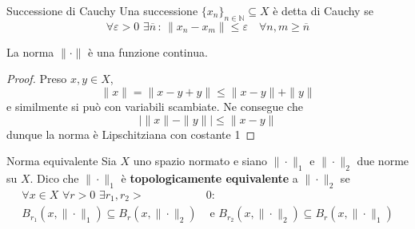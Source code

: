 \begin{definition}{Successione di Cauchy}
    Una successione \(\{x_{n}\}_{n \in \mathbb{N}} \subseteq X \) è detta di
    Cauchy se
    \[
      \forall \varepsilon >0 \,\, \exists \overline{n} \,:\, \|x_{n} - x_{m}\| \le \varepsilon \quad \forall n,m \ge \overline{n}
    \]
\end{definition}

\begin{remark}{}
    La norma \(\|\cdot \|\) è una funzione continua.
\end{remark}
\begin{proof}{}
    Preso \(x,y \in X\),
    \[
      \|x\| = \|x - y + y\| \le \|x -y\| + \|y\|
    \]
    e similmente si può con variabili scambiate. Ne consegue che
    \[
      \left| \|x\| - \|y\| \right| \le \|x - y\|
    \]
    dunque la norma è Lipschitziana con costante 1
\end{proof}

\begin{definition}{Norma equivalente}
    Sia \(X\) uno spazio normato e siano \(\|\cdot \|_{1} \) e \(\|\cdot \|_2\)
    due norme su \(X\). Dico che \(\|\cdot \|_1\) è \textbf{topologicamente
    equivalente} a \(\|\cdot \|_2\) se
    \begin{align*}
        \forall x \in X \,\, \forall r > 0 \,\, \exists r_{1}, r_{2} > &0 : \\
        B_{r_{1}}{(x, \|\cdot \|_1)} \subseteq B_{r}{(x, \|\cdot \|_2)} &\text{ e } B_{r_{2}} {(x, \|\cdot \|_2)} \subseteq B_{r} {(x, \|\cdot \|_1)} 
    \end{align*}
\end{definition}

